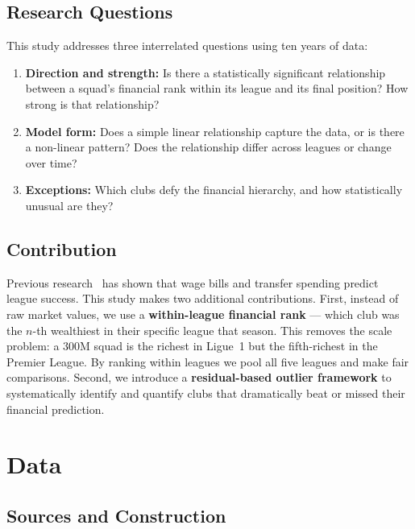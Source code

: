 \documentclass[11pt, a4paper]{article}
\begin{document}
\subsection{Research Questions}

This study addresses three interrelated questions using ten years of data:

\begin{enumerate}
  \item \textbf{Direction and strength:} Is there a statistically significant
        relationship between a squad's financial rank within its league and its
        final position? How strong is that relationship?
  \item \textbf{Model form:} Does a simple linear relationship capture the data,
        or is there a non-linear pattern? Does the relationship differ across
        leagues or change over time?
  \item \textbf{Exceptions:} Which clubs defy the financial hierarchy, and how
        statistically unusual are they?
\end{enumerate}

\subsection{Contribution}

Previous research~\citep{Szymanski1999, Frick2007} has shown that wage bills and
transfer spending predict league success. This study makes two additional
contributions. First, instead of raw market values, we use a
\textbf{within-league financial rank} --- which club was the $n$-th wealthiest
in their specific league that season. This removes the scale problem: a \EUR{}300M
squad is the richest in Ligue~1 but the fifth-richest in the Premier League. By
ranking within leagues we pool all five leagues and make fair comparisons. Second,
we introduce a \textbf{residual-based outlier framework} to systematically identify
and quantify clubs that dramatically beat or missed their financial prediction.

\section{Data}

\subsection{Sources and Construction}
\end{document}
